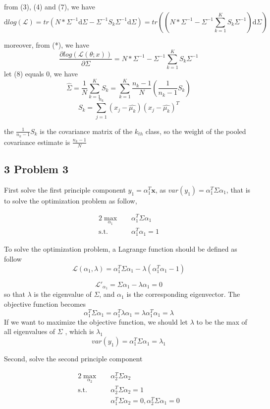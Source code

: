 \documentclass[10pt,a4paper]{article}
\begin{document}
from (3), (4) and (7), we have
\[ \mathrm{d}log(\mathcal{L})=tr(N*\Sigma^{-1}\mathrm{d}\Sigma-\Sigma^{-1}S_k\Sigma^{-1}\mathrm{d}\Sigma)=tr((N*\Sigma^{-1}-\Sigma^{-1}\sum_{k=1}^{K}S_k\Sigma^{-1})\mathrm{d}\Sigma) \]

moreover, from (*), we have
\[ \frac{\partial log(\mathcal{L}(\theta;x))}{\partial \Sigma}=N*\Sigma^{-1}-\Sigma^{-1}\sum_{k=1}^{K}S_k\Sigma^{-1}
\tag{8} \]
let (8) equals 0, we have
\[ \hat{\Sigma}=\frac{1}{N}\sum_{k=1}^{K}S_k=\sum_{k=1}^{K}\frac{n_k-1}{N}(\frac{1}{n_k-1}S_k)  \]
\[ S_k=\sum_{j=1}^{n_k}(x_j-\hat{\mu_{k}})(x_j-\hat{\mu_{k}})^T \]

the $ \frac{1}{n_k-1}S_k $ is the covariance matrix of the $k_{th}$ class, so the weight of the pooled covariance estimate is $\frac{n_k-1}{N}$


\subsection{3 Problem 3}
First solve the first principle component $ y_1=\alpha_1^T\mathbf{x} $, as $ var(y_1)=\alpha_1^T \Sigma \alpha_1 $, that is to solve the optimization problem as follow,

\begin{alignat*}{2}
	\max_{\alpha_1} \quad & \alpha_1^T \Sigma \alpha_1 \\
	\mbox{s.t.}\quad
	&\alpha_1^T\alpha_1 = 1 
\end{alignat*}

To solve the optimization problem, a Lagrange function should be defined as follow
\[ \mathcal{L}(\alpha_1, \lambda)= \alpha_1^T \Sigma \alpha_1 - \lambda(\alpha_1^T\alpha_1 - 1 ) \]

\[ \mathcal{L}'_{\alpha_1}= \Sigma \alpha_1 - \lambda \alpha_1=0 \]
so that $\lambda$ is the eigenvalue of $\Sigma$, and $\alpha_1$ is the corresponding eigenvector. The objective function becomes
\[ \alpha_1^T \Sigma \alpha_1=\alpha_1^T \lambda \alpha_1=\lambda \alpha_1^T  \alpha_1=\lambda \]
If we want to maximize the objective function, we should let $\lambda$ to be the max of all eigenvalues of $\Sigma$ , which is $\lambda_1$
\[ var(y_1)=\alpha_1^T \Sigma \alpha_1=\lambda_1 \]

Second, solve the second principle component 

\begin{alignat*}{2}
	\max_{\alpha_2} \quad & \alpha_2^T \Sigma \alpha_2 \\
	\mbox{s.t.}\quad
	&\alpha_2^T\Sigma\alpha_2 = 1 \\
	&\alpha_1^T\Sigma\alpha_2 = 0,  \alpha_2^T\Sigma\alpha_1 = 0
\end{alignat*}
\end{document}

